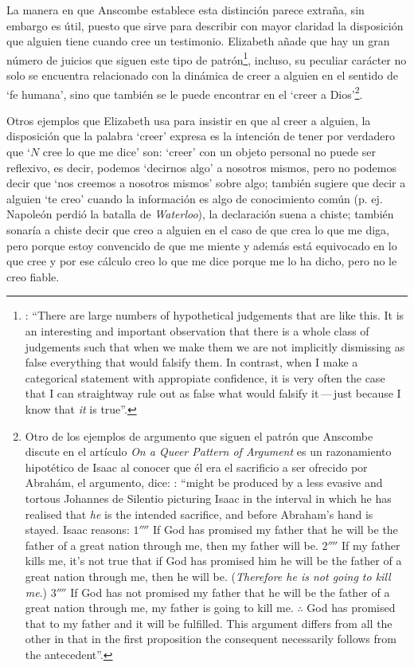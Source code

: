 La manera en que Anscombe establece esta distinción parece extraña, sin embargo es útil, puesto que sirve para describir con mayor claridad la disposición que alguien tiene cuando cree un testimonio. Elizabeth añade que hay un gran número de juicios que siguen este tipo de patrón\footnote{\cite[Cf.][302]{anscombe2015logic:qpa}: \enquote{There are large numbers of hypothetical judgements that are like this. It is an interesting and important observation that there is a whole class of judgements such that when we make them we are not implicitly dismissing as false everything that would falsify them. In contrast, when I make a categorical statement with appropiate confidence, it is very often the case that I can straightway rule out as false what would falsify it\,---\,just because I know that \emph{it} is true}.}, incluso, su peculiar carácter no solo se encuentra relacionado con la dinámica de creer a alguien en el sentido de `fe humana', sino que también se le puede encontrar en el `creer a Dios'\footnote{Otro de los ejemplos de argumento que siguen el patrón que Anscombe discute en el artículo \emph{On a Queer Pattern of Argument} es un razonamiento hipotético de Isaac al conocer que él era el sacrificio a ser ofrecido por Abrahám, el argumento, dice: \cite[Cf.][309]{anscombe2015logic:qpa}: \enquote{might be produced by a less evasive and tortous Johannes de Silentio picturing Isaac in the interval in which he has realised that \emph{he} is the intended sacrifice, and before Abraham's hand is stayed. Isaac reasons: $1''''$  If God has promised my father that he will be the father of a great nation through me, then my father will be. $2''''$  If my father kills me, it's not true that if God has promised him he will be the father of a great nation through me, then he will be. (\emph{Therefore he is not going to kill me}.) $3''''$  If God has not promised my father that he will be the father of a great nation through me, my father is going to kill me. $\mathbf{\therefore}$  God has promised that to my father and it will be fulfilled. This argument differs from all the other in that in the first proposition the consequent necessarily follows from the antecedent}.}.

Otros ejemplos que Elizabeth usa para insistir en que al creer a alguien, la disposición que la palabra `creer' expresa es la intención de tener por verdadero que \enquote*{$N$ cree lo que me dice} son: `creer' con un objeto personal no puede ser reflexivo, es decir, podemos `decirnos algo' a nosotros mismos, pero no podemos decir que `nos creemos a nosotros mismos' sobre algo; también sugiere que decir a alguien \enquote*{te creo} cuando la información es algo de conocimiento común (p. ej. Napoleón perdió la batalla de \emph{Waterloo}), la declaración suena a chiste; también sonaría a chiste decir que creo a alguien en el caso de que crea lo que me diga, pero porque estoy convencido de que me miente y además está equivocado en lo que cree y por ese cálculo creo lo que me dice porque me lo ha dicho, pero no le creo fiable.

